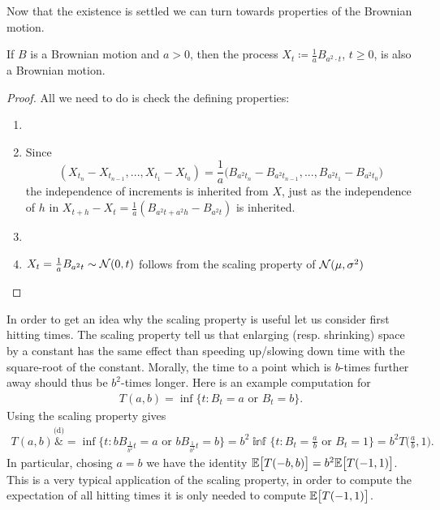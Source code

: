 Now that the existence is settled we can turn towards properties of the Brownian motion.
\begin{llemma}
\begin{prop}
	If $B$ is a Brownian motion and $a>0$, then the process $X_t \coloneqq \frac{1}{a} B_{a^2\cdot t}$, $t\geq 0$, is also a Brownian motion.
\end{prop}
\end{llemma}
\begin{proof}[Proof]
	All we need to do is check the defining properties:
	\begin{enumerate}[label=(\roman*)]
		\item \checkmark
		\item Since $$(X_{t_n}- X_{t_{n-1}},...,X_{t_1}-X_{t_0})=\frac{1}{a}\big( B_{a^2 t_n}-B_{a^2 t_{n-1}},...,B_{a^2 t_1}- B_{a^2 t_0}\big)$$ the independence of increments is inherited from $X$, just as the independence of $h$ in $X_{t+h}-X_t = \frac{1}{a}(B_{a^2t+a^2 h}-B_{a^2 t})$ is inherited.
		\item \checkmark
		\item $X_t = \frac{1}{a} B_{a^2 t} \sim \mathcal{N}(0,t)$ follows from the scaling property of $\mathcal{N}(\mu,\sigma^2)$
	\end{enumerate}
\end{proof}
In order to get an idea why the scaling property is useful let us consider first hitting times. The scaling property tell us that enlarging (resp. shrinking) space by a constant has the same effect than speeding up/slowing down time with the square-root of the constant. Morally, the time to a point which is $b$-times further away should thus be $b^2$-times longer. Here is an example computation for 
\begin{align*}
	T(a,b)=\inf \{ t\colon B_t = a \text{ or }B_t = b\}.
\end{align*}	
Using the scaling property gives
\begin{align*}
	 T(a,b)  \overset{\text{(d)}}&{=} \inf \big\{ t\colon b B_{\frac{1}{b^2}t} = a \text{ or } b B_{\frac{1}{b^2}t}=b \big\} 
	= b^2 \mathds  \inf\Big\{ t \colon B_t = \frac{a}{b} \text{ or } B_t = 1\Big\} 
	= b^2  T\big(\frac{a}{b},1\big).
\end{align*}
In particular, chosing $a=b$ we have the identity $\mathbb{E}\big[ T(-b,b)\big] = b^2 \mathbb{E} \big[ T(-1,1)\big]$. This is a very typical application of the scaling property, in order to compute the expectation of all hitting times it is only needed to compute $\mathbb{E}\big[ T(-1,1)\big]$.\smallskip

